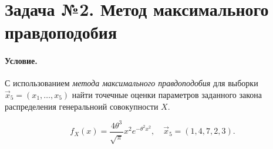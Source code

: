 
\section{Задача №2. Метод максимального правдоподобия}

\paragraph{Условие.} С использованием \emph{метода максимального правдоподобия} для выборки $\vec{x}_5 = (x_1, \dots, x_5)$ найти точечные оценки параметров заданного закона распределения генеральноий совокупности $X$.

\[
    f_X(x) = \frac{4\theta^3}{\sqrt{\pi}} x^2 e^{-\theta^2 x^2}, \quad \vec{x}_5 = (1, 4, 7, 2, 3).
\]